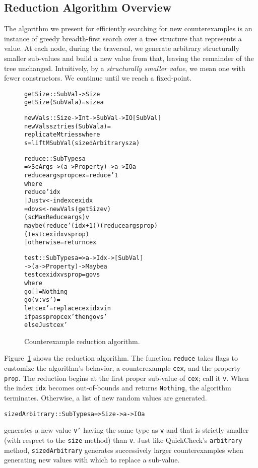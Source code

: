 \documentclass{sigplanconf}
\newenvironment{code}{\begin{alltt}\footnotesize}{\end{alltt}}
\newcommand{\ttp}[1]{\texttt{#1}}
\begin{document}
\subsection{Reduction Algorithm Overview}\label{sec:reduct}
The algorithm we present for efficiently searching for new counterexamples is an
instance of greedy breadth-first search over a tree structure that represents a
value.  At each node, during the traversal, we generate arbitrary
structurally smaller sub-values and build a new value from that, leaving
the remainder of the tree unchanged.  Intuitively, by a \emph{structurally
  smaller value}, we mean one with fewer constructors.  We continue until we
reach a fixed-point.


\begin{figure}[ht]
  \begin{code}
getSize :: SubVal -> Size
getSize (SubVal a) = size a

newVals :: Size -> Int -> SubVal -> IO [SubVal]
newVals sz tries (SubVal a) =
  replicateM tries s where
  s = liftM SubVal (sizedArbitrary sz a)

reduce :: SubTypes a
  => ScArgs -> (a -> Property) -> a -> IO a
reduce args prop cex = reduce' 1
  where
  reduce' idx
    | Just v <- index cex idx
    = do vs <- newVals (getSize v)
                 (scMaxReduce args) v
         maybe (reduce' (idx+1)) (reduce args prop)
               (test cex idx vs prop)
    | otherwise = return cex

test :: SubTypes a => a -> Idx -> [SubVal]
     -> (a -> Property) -> Maybe a
test cex idx vs prop = go vs
  where
  go []      = Nothing
  go (v:vs') =
    let cex' = replace cex idx v in
    if pass prop cex' then go vs'
      else Just cex'
  \end{code}
  \caption{Counterexample reduction algorithm.\label{fig:reduction}}
\end{figure}

Figure~\ref{fig:reduction} shows the reduction algorithm.  The function
\ttp{reduce} takes flags to customize the algorithm's behavior, a counterexample
\ttp{cex}, and the property \ttp{prop}.  The reduction begins at the first
proper sub-value of \ttp{cex}; call it \ttp{v}.  When the index \ttp{idx}
becomes out-of-bounds and returns \ttp{Nothing}, the algorithm terminates.
Otherwise, a list of new random values are generated.
%
\begin{code}
sizedArbitrary :: SubTypes a => Size -> a -> IO a
\end{code}
%
\noindent
generates a new value \ttp{v'} having the same type as \ttp{v} and that is
strictly smaller (with respect to the \ttp{size} method) than \ttp{v}.  Just
like QuickCheck's \ttp{arbitrary} method, \ttp{sizedArbitrary} generates
successively larger counterexamples when generating new values with which to
replace a sub-value.
\end{document}
